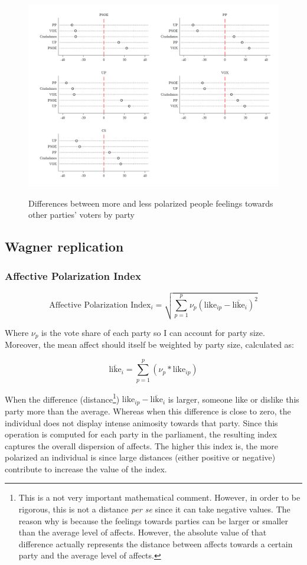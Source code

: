 \documentclass[a4paper, svgnames]{article}
\begin{document}
\begin{figure}[H]
	\centering
	\caption{Differences between more and less polarized people feelings towards other parties' voters by party}
	\includegraphics[width=\textwidth]{Figures/combined_dot_feelingsAP.png}
	\label{fig:dot-distances}
\end{figure}


\subsection{Wagner replication}

\subsubsection{Affective Polarization Index}

$$
	\text{Affective Polarization Index}_i = \sqrt{\sum^p_{p=1}\nu_p(\text{like}_{ip}-\overline{\text{like}}_i)^2}
$$

Where $\nu_p$ is the vote share of each party so I can account for party size. Moreover, the mean affect should itself be weighted by party size, calculated as:

$$
	\overline{\text{like}}_i = \sum^p_{p=1} (\nu_p * \text{like}_{ip})
$$

When the difference (distance\footnote{This is a not very important mathematical comment. However, in order to be rigorous, this is not a distance \textit{per se} since it can take negative values. The reason why is because the feelings towards parties can be larger or smaller than the average level of affects. However, the absolute value of that difference actually represents the distance between affects towards a certain party and the average level of affects.}) $\text{like}_{ip}-\overline{\text{like}}_i$ is larger, someone like or dislike this party more than the average. Whereas when this difference is close to zero, the individual does not display intense animosity towards that party. Since this operation is computed for each party in the parliament, the resulting index captures the overall dispersion of affects. The higher this index is, the more polarized an individual is since large distances (either positive or negative) contribute to increase the value of the index.
\end{document}
